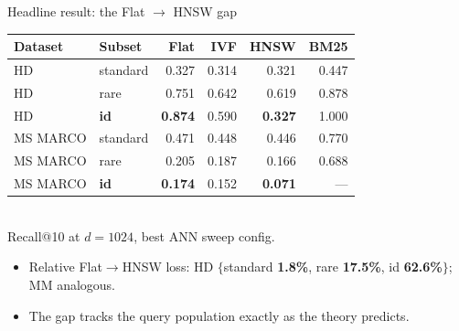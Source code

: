 \begin{frame}{Headline result: the Flat $\to$ HNSW gap}
  \begin{center}
    \small
    \setlength{\tabcolsep}{6pt}
    \begin{tabular}{llrrrr}
      \toprule
      \textbf{Dataset} & \textbf{Subset} & \textbf{Flat} & \textbf{IVF} & \textbf{HNSW} & \textbf{BM25} \\
      \midrule
      HD       & standard & 0.327 & 0.314 & 0.321 & 0.447 \\
      HD       & rare     & 0.751 & 0.642 & 0.619 & 0.878 \\
      HD       & {\color{accent}\textbf{id}} & {\color{accent}\textbf{0.874}} & 0.590 & {\color{accent}\textbf{0.327}} & 1.000 \\
      \midrule
      MS MARCO & standard & 0.471 & 0.448 & 0.446 & 0.770 \\
      MS MARCO & rare     & 0.205 & 0.187 & 0.166 & 0.688 \\
      MS MARCO & {\color{accent}\textbf{id}} & {\color{accent}\textbf{0.174}} & 0.152 & {\color{accent}\textbf{0.071}} & --- \\
      \bottomrule
    \end{tabular}\\[4pt]
    {\footnotesize Recall@10 at $d{=}1024$, best ANN sweep config.}
  \end{center}

  \vspace{0.4em}
  \begin{itemize}
    \item Relative Flat$\to$HNSW loss:
          HD $\{$standard \textbf{1.8\%}, rare \textbf{17.5\%},
          \alert{id \textbf{62.6\%}}$\}$; MM analogous.
    \item The gap tracks the query population exactly as the theory predicts.
  \end{itemize}
\end{frame}

